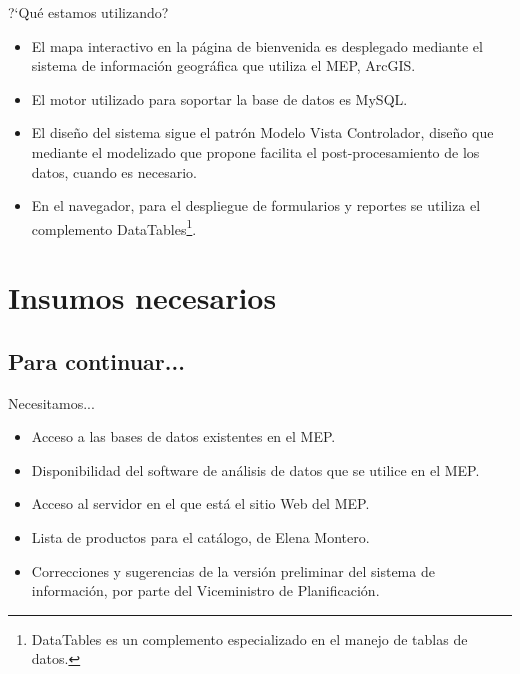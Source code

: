 \documentclass[xcolor=table, aspectratio=169]{beamer}
\begin{document}
\begin{frame}[t]{?`Qu\'e estamos utilizando?}
	\begin{itemize}
		\item El mapa interactivo en la p\'agina de bienvenida es desplegado mediante el sistema de informaci\'on geogr\'afica que utiliza el MEP, ArcGIS.
		\item El motor utilizado para soportar la base de datos es MySQL.
		\item El dise\~no del sistema sigue el patr\'on Modelo Vista Controlador, dise\~no que mediante el modelizado que propone facilita el post-procesamiento de los datos, cuando es necesario.
		\item En el navegador, para el despliegue de formularios y reportes se utiliza el complemento DataTables\footnote{DataTables es un complemento especializado en el manejo de tablas de datos.}.
	\end{itemize}
\end{frame}

\section{Insumos necesarios}
 
\subsection{Para continuar...}

\begin{frame}[t]{Necesitamos...}
	\begin{itemize}
		\item Acceso a las bases de datos existentes en el MEP.
		\item Disponibilidad del software de an\'alisis de datos que se utilice en el MEP.
		\item Acceso al servidor en el que est\'a el sitio Web del MEP.
		\item Lista de productos para el cat\'alogo, de Elena Montero.
		\item Correcciones y sugerencias de la versi\'on preliminar del sistema de informaci\'on, por parte del Viceministro de Planificaci\'on.
	\end{itemize}
\end{frame}
\end{document}
